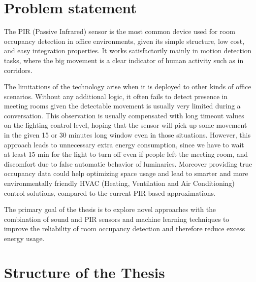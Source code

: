 \section{Problem statement}

The PIR (Passive Infrared) sensor is the most common device used for room occupancy detection in office environments, given its simple structure, low cost, and easy integration properties. It works satisfactorily mainly in motion detection tasks, where the big movement is a clear indicator of human activity such as in corridors.

The limitations of the technology arise when it is deployed to other kinds of office scenarios. Without any additional logic, it often fails to detect presence in meeting rooms given the detectable movement is usually very limited during a conversation.
This observation is usually compensated with long timeout values on the lighting control level, hoping that the sensor will pick up some movement in the given 15 or 30 minutes long window even in those situations. However, this approach leads to unnecessary extra energy consumption, since we have to wait at least 15 min for the light to turn off even if people left the meeting room, and discomfort due to false automatic behavior of luminaries.
Moreover providing true occupancy data could help optimizing space usage and lead to smarter and more environmentally friendly HVAC (Heating, Ventilation and Air Conditioning) control solutions, compared to the current PIR-based approximations.

The primary goal of the thesis is to explore novel approaches with the combination of sound and PIR sensors and machine learning techniques to improve the reliability of room occupancy detection and therefore reduce excess energy usage.



\section{Structure of the Thesis}
\label{section:structure} 

